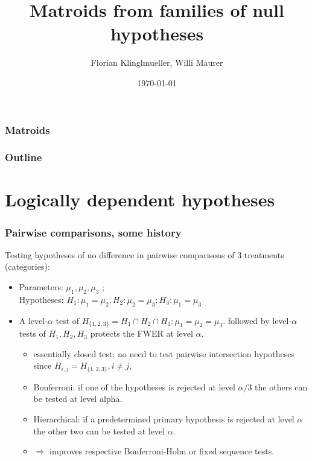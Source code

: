 \documentclass[bigger]{beamer}
\title{Matroids from families of null hypotheses}
\author{Florian Klinglmueller, Willi Maurer}
\date{\today}
\begin{document}
\frametitle{Matroids}

\maketitle



\begin{frame}
\frametitle{Outline}
\setcounter{tocdepth}{3}
\tableofcontents
\end{frame}




\section{Logically dependent hypotheses}


\begin{frame}
\frametitle{Pairwise comparisons, some history }

Testing hypotheses of no difference in pairwise comparisons of 3 treatments (categories):
\begin{itemize}
  \item Parameters: $\mu_1,\mu_2,\mu_3$ ; \\ Hypotheses: $H_1:\mu_1=\mu_2,H_2:\mu_2=\mu_3;H_3:\mu_1=\mu_3$
  \item A level-$\alpha$ test of $H_ {\{1,2,3\}} = H_1\cap H_2 \cap H_3 : \mu_1=\mu_2=\mu_3$. followed by level-$\alpha$ tests of $H_1,H_2,H_3$ protects the FWER at level $\alpha$.
  \begin{itemize}
    \item  essentially closed test; no need to test pairwise intersection hypotheses since $H_{{i,j}} = H_{\{1,2,3\}}, i\neq j$,
    \item  Bonferroni: if one of the hypotheses is rejected at level $\alpha/3$ the others can be tested at level alpha.
    \item  Hierarchical: if a predetermined primary hypothesis is rejected at level $\alpha$ the other two can be tested at level $\alpha$.
    \item  $\Rightarrow$ improves respective Bonferroni-Holm or fixed sequence tests.
  \end{itemize}
\end{itemize}
\end{frame}
\end{document}
